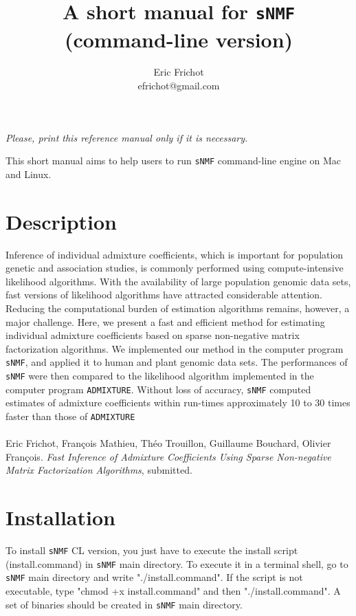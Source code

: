\documentclass[10pt,a4paper]{article}
\title{\bf \Large A short manual for {\tt sNMF}\\
\large (command-line version)
}
\author{
        Eric Frichot\\efrichot@gmail.com\\
}
\begin{document}
\maketitle
\begin{center}
{\it Please, print this reference manual only if it is necessary.}
\end{center}

\noindent
This short manual aims to help users to run {\tt sNMF} command-line engine on Mac and Linux. 

\section{Description} 
Inference of individual admixture coefficients, which is important for population genetic and association studies, is commonly performed using compute-intensive likelihood algorithms. With the availability of large population genomic data sets, fast versions of likelihood algorithms have attracted considerable attention. Reducing the computational burden of estimation algorithms remains, however, a major challenge. Here, we present a fast and efficient method for estimating individual admixture coefficients based on sparse non-negative matrix factorization algorithms. We implemented our method in the computer program {\tt sNMF}, and applied it to human and plant genomic data sets. The performances of {\tt sNMF} were then compared to the likelihood algorithm implemented in the computer program {\tt ADMIXTURE}.  Without loss of accuracy, {\tt sNMF} computed estimates of admixture coefficients within run-times approximately 10 to 30 times faster than those of {\tt ADMIXTURE}
\\
\\
\noindent
Eric Frichot, François Mathieu, Théo Trouillon, Guillaume Bouchard, Olivier François. {\it Fast Inference of Admixture Coefficients Using Sparse Non-negative Matrix Factorization Algorithms}, submitted. 

\section{Installation} 

\noindent
To install {\tt sNMF} CL version, you just have to execute the install script (install.command) 
in {\tt sNMF} main directory.
To execute it in a terminal shell, go to {\tt sNMF} main directory and write "./install.command".
If the script is not executable, type "chmod +x install.command" and then "./install.command".
A set of binaries should be created in {\tt sNMF} main directory.
\end{document}
